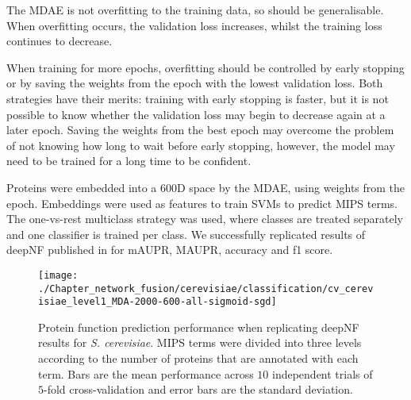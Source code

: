 The MDAE is not overfitting to the training data, so should be generalisable. When overfitting occurs, the validation loss increases, whilst the training loss continues to decrease.

When training for more epochs, overfitting should be controlled by early stopping or by saving the weights from the epoch with the lowest validation loss. Both strategies have their merits: training with early stopping is faster, but it is not possible to know whether the validation loss may begin to decrease again at a later epoch. Saving the weights from the best epoch may overcome the problem of not knowing how long to wait before early stopping, however, the model may need to be trained for a long time to be confident.

Proteins were embedded into a $600$D space by the MDAE, using weights from the  epoch. Embeddings were used as features to train SVMs to predict MIPS terms. The one-vs-rest multiclass strategy was used, where classes are treated separately and one classifier is trained per class.
We successfully replicated results of deepNF published in \cite{Gligorijevic2018} for mAUPR, MAUPR, accuracy and f1 score.


\begin{figure}[!ht]
    \centering
    \texttt{[image: ./Chapter\_network\_fusion/cerevisiae/classification/cv\_cerevisiae\_level1\_MDA-2000-600-all-sigmoid-sgd]}
    \caption{%
        Protein function prediction performance when replicating deepNF results for \emph{S. cerevisiae}.
        MIPS terms were divided into three levels according to the number of proteins that are annotated with each term.
        Bars are the mean performance across $10$ independent trials of $5$-fold cross-validation and error bars are the standard deviation.
    }
    \label{fig:replicate-deepNF-cv}
\end{figure}


